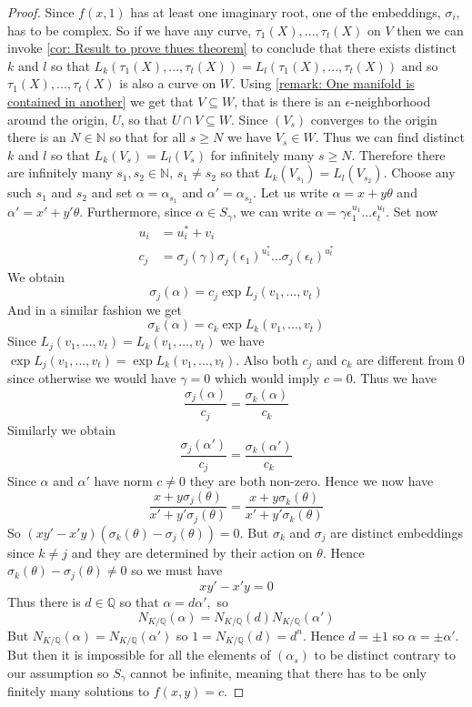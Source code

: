 \documentclass{article}
\newcommand{\mbb}[1]{\mathbb{#1}}
\numberwithin{equation}{section}
\begin{document}
\begin{proof}
    Since $f(x,1)$ has at least one imaginary root, one of the embeddings, $\sigma_i$, has to be complex. So if we have any curve, $\tau_1(X), ..., \tau_t(X)$ on $V$ then we can invoke \cref{cor: Result to prove thues theorem} to conclude that there exists distinct $k$ and $l$ so that $L_{k}(\tau_1(X), ..., \tau_t(X))= L_{l}(\tau_1(X), ..., \tau_t(X))$ and so $\tau_1(X), ..., \tau_t(X)$ is also a curve on $W$. Using \cref{remark: One manifold is contained in another} we get that $V \subseteq W$, that is there is an $\epsilon$-neighborhood around the origin, $U$, so that $U \cap V \subseteq W$. Since $(V_s)$ converges to the origin there is an $N \in \mbb N$ so that for all $s \geq N$ we have $V_s \in W$. Thus we can find distinct $k$ and $l$ so that $L_k(V_s) = L_l(V_s)$ for infinitely many $s \geq N$. Therefore there are infinitely many $s_1, s_2 \in \mbb N$, $s_1 \neq s_2$ so that $L_k(V_{s_1}) = L_l(V_{s_2})$. Choose any such $s_1$ and $s_2$ and set $\alpha = \alpha_{s_1}$ and $\alpha' = \alpha_{s_2}$. Let us write $\alpha = x + y \theta$ and $\alpha' = x' + y'\theta$. Furthermore, since $\alpha \in S_\gamma$, we can write $\alpha = \gamma \epsilon_1^{u_1}...\epsilon_t^{u_t}$. Set now
    \begin{align*}
        u_i & = u_i^* + v_i                                                                 \\
        c_j & = \sigma_j(\gamma)\sigma_j(\epsilon_1)^{u_1^*}...\sigma_j(\epsilon_t)^{u_t^*}
    \end{align*}
    We obtain
    $$\sigma_j(\alpha) = c_j \exp L_j(v_1, ..., v_t)$$
    And in a similar fashion we get
    $$\sigma_k(\alpha) = c_k \exp L_k(v_1, ..., v_t)$$
    Since $L_j(v_1, ..., v_t) = L_k(v_1, ..., v_t)$ we have $\exp L_j(v_1, ..., v_t) = \exp L_k(v_1, ..., v_t)$. Also both $c_j$ and $c_k$ are different from 0 since otherwise we would have $\gamma = 0$ which would imply $c = 0$. Thus we have
    $$\frac{\sigma_j(\alpha)}{c_j} = \frac{\sigma_k(\alpha)}{c_k}$$
    Similarly we obtain
    $$\frac{\sigma_j(\alpha')}{c_j} = \frac{\sigma_k(\alpha')}{c_k}$$
    Since $\alpha$ and $\alpha'$ have norm $c \neq 0$ they are both non-zero. Hence we now have
    $$\frac{x + y \sigma_j(\theta)}{x' + y' \sigma_j(\theta)} = \frac{x + y \sigma_k(\theta)}{x' + y' \sigma_k(\theta)}$$
    So
    $(xy' - x'y)(\sigma_k(\theta) - \sigma_j(\theta)) = 0$.
    But $\sigma_k$ and $\sigma_j$ are distinct embeddings since $k \neq j$ and they are determined by their action on $\theta$. Hence $\sigma_k(\theta) - \sigma_j(\theta) \neq 0$ so we must have
    $$xy' - x'y = 0$$
    Thus there is $d \in \mbb Q$ so that
    $\alpha = d\alpha',$ so $$N_{K/\mbb Q}(\alpha) = N_{K/\mbb Q}(d) N_{K/\mbb Q}(\alpha')$$
    But $N_{K/\mbb Q}(\alpha) = N_{K/\mbb Q}(\alpha')$ so $1 = N_{K/\mbb Q}(d) = d^n$. Hence $d = \pm 1$ so $\alpha = \pm \alpha'$. But then it is impossible for all the elements of $(\alpha_s)$ to be distinct contrary to our assumption so $S_\gamma$ cannot be infinite, meaning that there has to be only finitely many solutions to $f(x, y) = c$.
\end{proof}
\end{document}
